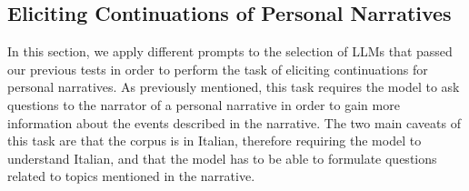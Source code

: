 
\subsection{Eliciting Continuations of Personal Narratives}
\label{cha:methodology-personal-narrative-elicitation}
In this section, we apply different prompts to the selection of LLMs that passed our previous tests in order to perform the task of eliciting continuations for personal narratives.  As previously mentioned, this task requires the model to ask questions to the narrator of a personal narrative in order to gain more information about the events described in the narrative. The two main caveats of this task are that the corpus is in Italian, therefore requiring the model to understand Italian, and that the model has to be able to formulate questions related to topics mentioned in the narrative. 

